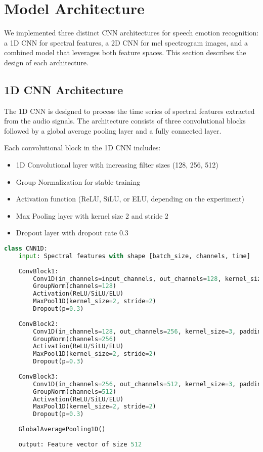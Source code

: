 \section{Model Architecture}

We implemented three distinct CNN architectures for speech emotion recognition: a 1D CNN for spectral features, a 2D CNN for mel spectrogram images, and a combined model that leverages both feature spaces. This section describes the design of each architecture.

\subsection{1D CNN Architecture}

The 1D CNN is designed to process the time series of spectral features extracted from the audio signals. The architecture consists of three convolutional blocks followed by a global average pooling layer and a fully connected layer.

Each convolutional block in the 1D CNN includes:
\begin{itemize}
    \item 1D Convolutional layer with increasing filter sizes (128, 256, 512)
    \item Group Normalization for stable training
    \item Activation function (ReLU, SiLU, or ELU, depending on the experiment)
    \item Max Pooling layer with kernel size 2 and stride 2
    \item Dropout layer with dropout rate 0.3
\end{itemize}

\begin{lstlisting}[language=Python, style=pseudocode, caption=1D CNN Architecture (Pseudocode)]
class CNN1D:
    input: Spectral features with shape [batch_size, channels, time]
    
    ConvBlock1:
        Conv1D(in_channels=input_channels, out_channels=128, kernel_size=3, padding=1)
        GroupNorm(channels=128)
        Activation(ReLU/SiLU/ELU)
        MaxPool1D(kernel_size=2, stride=2)
        Dropout(p=0.3)
    
    ConvBlock2:
        Conv1D(in_channels=128, out_channels=256, kernel_size=3, padding=1)
        GroupNorm(channels=256)
        Activation(ReLU/SiLU/ELU)
        MaxPool1D(kernel_size=2, stride=2)
        Dropout(p=0.3)
    
    ConvBlock3:
        Conv1D(in_channels=256, out_channels=512, kernel_size=3, padding=1)
        GroupNorm(channels=512)
        Activation(ReLU/SiLU/ELU)
        MaxPool1D(kernel_size=2, stride=2)
        Dropout(p=0.3)
    
    GlobalAveragePooling1D()
    
    output: Feature vector of size 512
\end{lstlisting}

